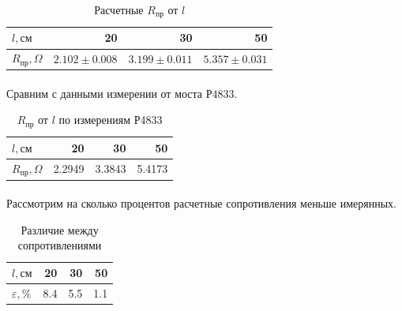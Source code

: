 \documentclass[a4paper, 12pt]{article}
\begin{document}
    \begin{table}[H]
        \begin{center}

        \begin{tabular}{|l|r|r|r|}
        \hline
        $l, см$          &  20 & 30 & 50 \\
        \hline
        $R_{пр}, \Omega$ &  $2.102\pm0.008$ & $3.199\pm0.011$  & $5.357\pm0.031$\\
        \hline
        \end{tabular}
            \caption{Расчетные $R_{пр}$ от $l$}
        \end{center}

    \end{table}

    \paragraph{}
    Сравним с данными измерении от моста Р4833.

    \begin{table}[H]
        \begin{center}

        \begin{tabular}{|l|r|r|r|}
        \hline
        $l, см$          &  20 & 30 & 50 \\
        \hline
        $R_{пр}, \Omega$ &  2.2949 & 3.3843 & 5.4173 \\
        \hline
        \end{tabular}
            \caption{$R_{пр}$ от $l$ по измерениям Р4833}
        \end{center}

    \end{table}

    \paragraph{}
    Рассмотрим на сколько процентов расчетные сопротивления меньше имерянных.

    \begin{table}[H]
        \begin{center}

        \begin{tabular}{|l|r|r|r|}
        \hline
        $l, см$          &  20 & 30 & 50 \\
        \hline
        $\varepsilon, \%$ &  8.4 & 5.5 & 1.1 \\
        \hline
        \end{tabular}
            \caption{Различие между сопротивлениями}
        \end{center}

    \end{table}
\end{document}
